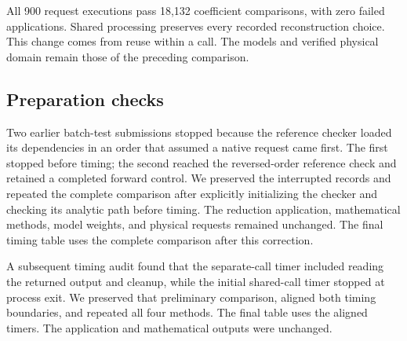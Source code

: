 All 900 request executions pass 18,132 coefficient comparisons, with zero failed applications. Shared processing preserves every recorded reconstruction choice. This change comes from reuse within a call. The models and verified physical domain remain those of the preceding comparison.


\subsection{Preparation checks}
Two earlier batch-test submissions stopped because the reference checker loaded its dependencies in an order that assumed a native request came first. The first stopped before timing; the second reached the reversed-order reference check and retained a completed forward control. We preserved the interrupted records and repeated the complete comparison after explicitly initializing the checker and checking its analytic path before timing. The reduction application, mathematical methods, model weights, and physical requests remained unchanged. The final timing table uses the complete comparison after this correction.

A subsequent timing audit found that the separate-call timer included reading the returned output and cleanup, while the initial shared-call timer stopped at process exit. We preserved that preliminary comparison, aligned both timing boundaries, and repeated all four methods. The final table uses the aligned timers. The application and mathematical outputs were unchanged.
